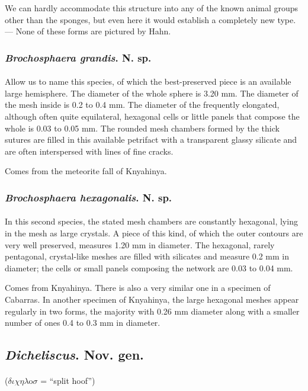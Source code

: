 \documentclass[a4paper, 12pt, oneside]{article}
\begin{document}
We can hardly accommodate this structure into any of the known animal groups other than the sponges, but even here it would establish a completely new type. --- None of these forms are pictured by Hahn.
\subsubsection{\emph{Brochosphaera grandis}. N. sp.}
\paragraph{}
Allow us to name this species, of which the best-preserved piece is an available large hemisphere. The diameter of the whole sphere is 3.20 mm. The diameter of the mesh inside is 0.2 to 0.4 mm. The diameter of the frequently elongated, although often quite equilateral, hexagonal cells or little panels that compose the whole is 0.03 to 0.05 mm. The rounded mesh chambers formed by the thick sutures are filled in this available petrifact with a transparent glassy silicate and are often interspersed with lines of fine cracks.

Comes from the meteorite fall of Knyahinya.
\subsubsection{\emph{Brochosphaera hexagonalis}. N. sp.}
\paragraph{}
In this second species, the stated mesh chambers are constantly hexagonal, lying in the mesh as large crystals. A piece of this kind, of which the outer contours are very well preserved, measures 1.20 mm in diameter. The hexagonal, rarely pentagonal, crystal-like meshes are filled with silicates and measure 0.2 mm in diameter; the cells or small panels composing the network are 0.03 to 0.04 mm.

Comes from Knyahinya. There is also a very similar one in a specimen of Cabarras. In another specimen of Knyahinya, the large hexagonal meshes appear regularly in two forms, the majority with 0.26 mm diameter along with a smaller number of ones 0.4 to 0.3 mm in diameter.
\subsection{\emph{Dicheliscus}. Nov. gen.}
\paragraph{}
($\delta\iota\chi\eta\lambda$o$\sigma$ = ``split hoof'')%
\end{document}
